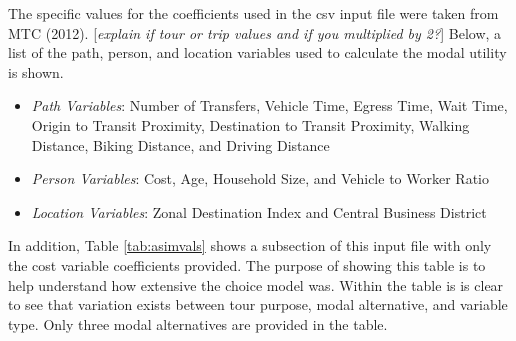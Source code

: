 \documentclass[12pt, oneside, openright]{byuthesis}
\providecommand{\tightlist}{%
  \setlength{\itemsep}{0pt}\setlength{\parskip}{0pt}}
\begin{document}
The specific values for the coefficients used in the csv input file were taken from MTC (2012). {[}\emph{explain if tour or trip values and if you multiplied by 2?}{]} Below, a list of the path, person, and location variables used to calculate the modal utility is shown.

\begin{itemize}
\tightlist
\item
  \emph{Path Variables}: Number of Transfers, Vehicle Time, Egress Time, Wait Time, Origin to Transit Proximity, Destination to Transit Proximity, Walking Distance, Biking Distance, and Driving Distance
\item
  \emph{Person Variables}: Cost, Age, Household Size, and Vehicle to Worker Ratio
\item
  \emph{Location Variables}: Zonal Destination Index and Central Business District
\end{itemize}

In addition, Table \ref{tab:asimvals} shows a subsection of this input file with only the cost variable coefficients provided. The purpose of showing this table is to help understand how extensive the choice model was. Within the table is is clear to see that variation exists between tour purpose, modal alternative, and variable type. Only three modal alternatives are provided in the table.
\end{document}
